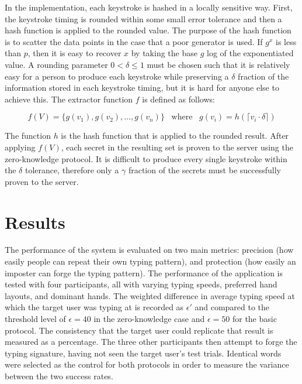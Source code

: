 \documentclass[11pt]{article}
\begin{document}
In the implementation, each keystroke is hashed in a locally sensitive way. First, the keystroke timing is rounded within some small error tolerance and then a hash function is applied to the rounded value. The purpose of the hash function is to scatter the data points in the case that a poor generator is used. If $g^x$ is less than $p$, then it is easy to recover $x$ by taking the base $g$ log of the exponentiated value. A rounding parameter $0 < \delta \le 1$ must be chosen such that it is relatively easy for a person to produce each keystroke while preserving a $\delta$ fraction of the information stored in each keystroke timing, but it is hard for anyone else to achieve this. The extractor function $f$ is defined as follows:

$$f(V) = \{g(v_1),g(v_2),\ldots,g(v_n)\}\;\;\;\text{where}\;\;\;g(v_i) = h(\lceil v_i\cdot\delta\rceil)$$

\noindent The function $h$ is the hash function that is applied to the rounded result. After applying $f(V)$, each secret in the resulting set is proven to the server using the zero-knowledge protocol. It is difficult to produce every single keystroke within the $\delta$ tolerance, therefore only a $\gamma$ fraction of the secrets must be successfully proven to the server.


\section{Results}
\label{sec:results}
The performance of the system is evaluated on two main metrics: precision (how easily people can repeat their own typing pattern), and protection (how easily an imposter can forge the typing pattern). The performance of the application is tested with four participants, all with varying typing speeds, preferred hand layouts, and dominant hands. The weighted difference in average typing speed at which the target user was typing at is recorded as $\epsilon'$ and compared to the threshold level of $\epsilon=40$ in the zero-knowledge case and $\epsilon=50$ for the basic protocol. The consistency that the target user could replicate that result is measured as a percentage. The three other participants then attempt to forge the typing signature, having not seen the target user's test trials.  Identical words were selected as the control for both protocols in order to measure the variance between the two success rates.
\end{document}

